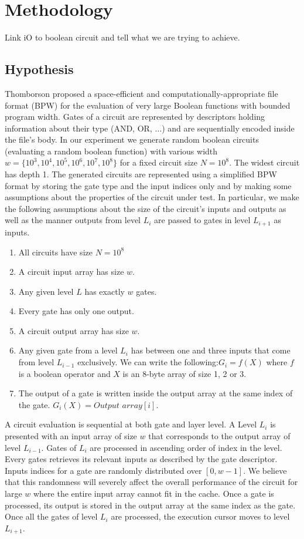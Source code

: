 \section{Methodology}
Link iO to boolean circuit and tell what we are trying to achieve.

\subsection{Hypothesis}
Thomborson proposed a space-efficient and computationally-appropriate file format (BPW) for the evaluation of very large Boolean functions with bounded program width\cite{clark}. Gates of a circuit are represented by descriptors holding information about their type (AND, OR, $\dots$) and are sequentially encoded inside the file's body. In our experiment we generate random boolean circuits (evaluating a random boolean function) with various width $w = \{ 10^3, 10^4, 10^5, 10^6, 10^7, 10^8\}$ for a fixed circuit size $N = 10^8$. The widest circuit has depth 1. The generated circuits are represented using a simplified BPW format by storing the gate type and the input indices only and by making some assumptions about the properties of the circuit under test. In particular, we make the following assumptions about the size of the circuit's inputs and outputs as well as the manner outputs from level $L_i$ are passed to gates in level $L_{i+1}$ as inputs.
\begin{enumerate}  
\item All circuits have size $N = 10^8$
\item A circuit input array has size $w$.
\item Any given level $L$ has exactly $w$ gates.
\item Every gate has only one output.
\item A circuit output array has size $w$.
\item Any given gate from a level $L_i$ has between one and three inputs that come from level $L_{i-1}$ exclusively. We can write the following:\break $G_i = f(X)$ where $f$ is a boolean operator and $X$ is an 8-byte array of size 1, 2 or 3. 
\item The output of a gate is written inside the output array at the same index of the gate. $G_i(X) = Output$ $array[i]$.
\end{enumerate}
A circuit evaluation is sequential at both gate and layer level. A Level $L_i$ is presented with an input array of size $w$ that corresponds to the output array of level $L_{i-1}$. Gates of $L_i$ are processed in ascending order of index in the level. Every gates retrieves its relevant inputs as described by the gate descriptor. Inputs indices for a gate are randomly distributed over $[0, w-1]$. We believe that this randomness will severely affect the overall performance of the circuit for large $w$ where the entire input array cannot fit in the cache. Once a gate is processed, its output is stored in the output array at the same index as the gate. Once all the gates of level $L_i$ are processed, the execution cursor moves to level $L_{i+1}$.
